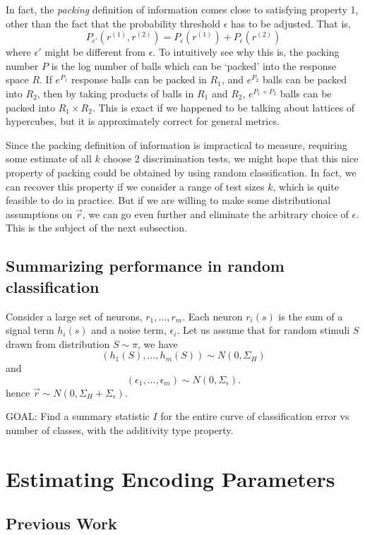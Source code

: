 \documentclass[12pt]{article}
\begin{document}
In fact, the \emph{packing} definition of information comes close to satisfying property 1, other than the fact that the probability threshold $\epsilon$ has to be adjusted.  That is,
\[
P_{\epsilon'}(r^{(1)}, r^{(2)}) = P_\epsilon(r^{(1)}) + P_\epsilon(r^{(2)})
\]
where $\epsilon'$ might be different from $\epsilon$.  To intuitively
see why this is, the packing number $P$ is the log number of balls
which can be `packed' into the response space $R$.  If $e^{P_1}$
response balls can be packed in $R_1$, and $e^{P_2}$ balls can be
packed into $R_2$, then by taking products of balls in $R_1$ and
$R_2$, $e^{P_1 + P_2}$ balls can be packed into $R_1 \times R_2$.
This is exact if we happened to be talking about lattices of
hypercubes, but it is approximately correct for general metrics.

Since the packing definition of information is impractical to measure,
requiring some estimate of all $k$ choose 2 discrimination tests, we
might hope that this nice property of packing could be obtained by
using random classification.  In fact, we can recover this property if
we consider a range of test sizes $k$, which is quite feasible to do
in practice.  But if we are willing to make some distributional
assumptions on $\vec{r}$, we can go even further and eliminate the
arbitrary choice of $\epsilon$.  This is the subject of the next
subsection.

\subsection{Summarizing performance in random classification}

Consider a large set of neurons, $r_1,\hdots, r_m$.  Each neuron
$r_i(s)$ is the sum of a signal term $h_i(s)$ and a noise term,
$\epsilon_i$.  Let us assume that for random stimuli $S$ drawn from
distribution $S \sim \pi$, we have
\[
(h_1(S),\hdots, h_m(S)) \sim N(0, \Sigma_H)
\]
and
\[
(\epsilon_1,\hdots, \epsilon_m) \sim N(0, \Sigma_\epsilon).
\]
hence $\vec{r} \sim N(0, \Sigma_H + \Sigma_\epsilon).$

GOAL: Find a summary statistic $I$ for the entire curve of
classification error vs number of classes, with the additivity type
property.

\section{Estimating Encoding Parameters}

\subsection{Previous Work}
\end{document}
